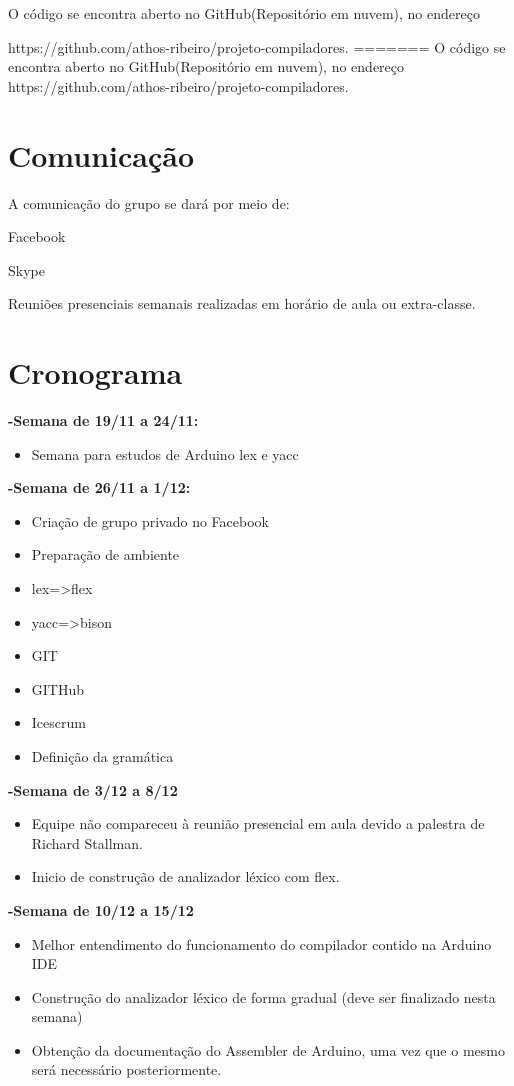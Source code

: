 \documentclass{abnt}
\begin{document}
O código se encontra aberto no GitHub(Repositório em nuvem), no endereço

 https://github.com/athos-ribeiro/projeto-compiladores.
=======
O código se encontra aberto no GitHub(Repositório em nuvem), no endereço https://github.com/athos-ribeiro/projeto-compiladores.

\section{Comunicação}
    A comunicação do grupo se dará por meio de:

    Facebook

    Skype

    Reuniões presenciais semanais realizadas em horário de aula ou extra-classe.

\section{Cronograma}
\textbf{-Semana de 19/11 a 24/11:}
\begin{itemize}
    \item Semana para estudos de Arduino lex e yacc
\end{itemize}
         \textbf{-Semana de 26/11 a 1/12:}
         \begin{itemize}
             \item Criação de grupo privado no Facebook
\item Preparação de ambiente
\item lex=>flex
\item yacc=>bison
\item GIT
\item GITHub
\item Icescrum
\item Definição da gramática
    \end{itemize}
    \textbf{-Semana de 3/12 a 8/12}
         \begin{itemize}
             \item Equipe não compareceu à reunião presencial em aula devido a palestra de Richard Stallman.
             \item Inicio de construção de analizador léxico com flex.
    \end{itemize}
    \textbf{-Semana de 10/12 a 15/12}
         \begin{itemize}
             \item Melhor entendimento do funcionamento do compilador contido na Arduino IDE
             \item Construção do analizador léxico de forma gradual (deve ser finalizado nesta semana)
             \item Obtenção da documentação do Assembler de Arduino, uma vez que o mesmo será necessário posteriormente.
    \end{itemize}
\end{document}
